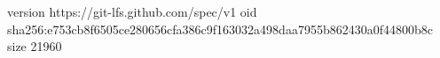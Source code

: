 version https://git-lfs.github.com/spec/v1
oid sha256:e753cb8f6505ce280656cfa386c9f163032a498daa7955b862430a0f44800b8c
size 21960
